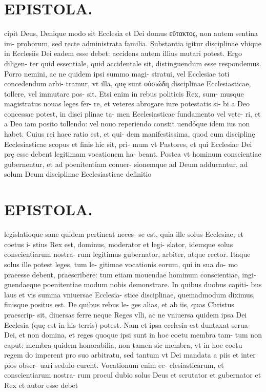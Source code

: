 \documentclass{article}
\begin{document}
\begin{pages}
\section*{EPISTOLA. }cipit Deus, Denique modo sit Ecclesia et Dei domus εὔτακτος, non autem sentina im- proborum, sed recte administrata familia. Substantia igitur disciplinae vbique in Ecclesiis Dei eadem esse debet: accidens autem illius mutari potest. Ergo diligen- ter quid essentiale, quid accidentale sit, distinguendum esse respondemus. Porro nemini, ac ne quidem ipsi summo magi- stratui, vel Ecclesiae toti concedendum arbi- tramur, vt illa, quę sunt οὐσιώδη disciplinae Ecclesiasticae, tollere, vel immutare pos- sit. Etsi enim in rebus politicis Rex, sum- musque magistratus nouas leges fer- re, et veteres abrogare iure potestatis si- bi a Deo concessae potest, in disci plinae ta- men Ecclesiasticae fundamento vel vete- ri, et a Deo iam posito tollendo: vel nouo reperiendo constit uendóque idem ius non habet. Cuius rei haec ratio est, et qui- dem manifestissima, quod cum disciplinę Ecclesiasticae scopus et finis hic sit, pri- mum vt Pastores, et qui Ecclesiae Dei prę esse debent legitimam vocationem ha- beant. Postea vt hominum conscientiae gubernentur, et ad poenitentiam conuer- sionemque ad Deum adducantur, ad solum Deum disciplinae Ecclesiasticae definitio 
\section*{EPISTOLA. }legislatioque sane quidem pertineat neces- se est, quia ille solus Ecclesiae, et coetus i- stius Rex est, dominus, moderator et legi- slator, idemque solus conscientiarum nostra- rum legitimus gubernator, arbiter, atque rector. Itaque solus ille potest leges, tum le- gitimae vocationis eorum, qui in sua do- mo praeesse debent, praescribere: tum etiam mouendae hominum conscientiae, ingi- gnendaeque poenitentiae modum nobis demonstrare. In quibus duobus capiti- bus laus et vis summa vniuersae Ecclesia- stice disciplinae, quemadmodum diximus, finisque positus est. De quibus rebus le- ges alias, et ab iis, quas Christus praescrip- sit, diuersas ferre neque Reges vlli, ac ne vniuersa quidem ipsa Dei Ecclesia (quę est in his terris) potest. Nam et ipsa ecclesia est duntaxat serua Dei, et non domina, et reges quoque ipsi sunt in hoc coetu membra tam- tum non caput: membra quidem honorabilia, non tamen sic membra, vt in hoc coetu regem do imperent pro suo arbitratu, sed tantum vt Dei mandata a piis et inter pios obser- uari sedulo curent. Vocationum enim ec- clesiasticarum, et conscientiarum nostra- rum procul dubio solus Deus et scrutator et gubernator et Rex et autor esse debet 

\end{pages}
\end{document}
